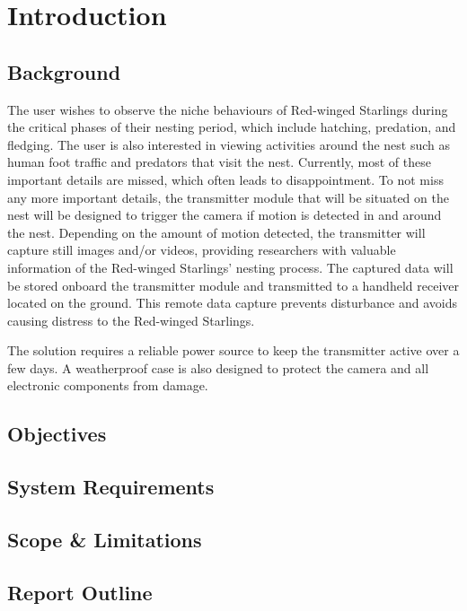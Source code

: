 \documentclass[class=report,11pt,crop=false]{standalone}
\begin{document}
\chapter{Introduction \label{ch:introduction}}



\section{Background}
The user wishes to observe the niche behaviours of Red-winged Starlings during the critical phases of their nesting period, which include hatching, predation, and fledging. The user is also interested in viewing activities around the nest such as human foot traffic and predators that visit the nest. Currently, most of these important details are missed, which often leads to disappointment. To not miss any more important details, the transmitter module that will be situated on the nest will be designed to trigger the camera if motion is detected in and around the nest. Depending on the amount of motion detected, the transmitter will capture still images and/or videos, providing researchers with valuable information of the Red-winged Starlings’ nesting process. The captured data will be stored onboard the transmitter module and transmitted to a handheld receiver located on the ground. This remote data capture prevents disturbance and avoids causing distress to the Red-winged Starlings. 

The solution requires a reliable power source to keep the transmitter active over a few days. A weatherproof case is also designed to protect the camera and all electronic components from damage. 

\section{Objectives}


\section{System Requirements}


\section{Scope \& Limitations}


\section{Report Outline}


\ifstandalone

\printnoidxglossary[type=\acronymtype,nonumberlist]
\fi
\end{document}
